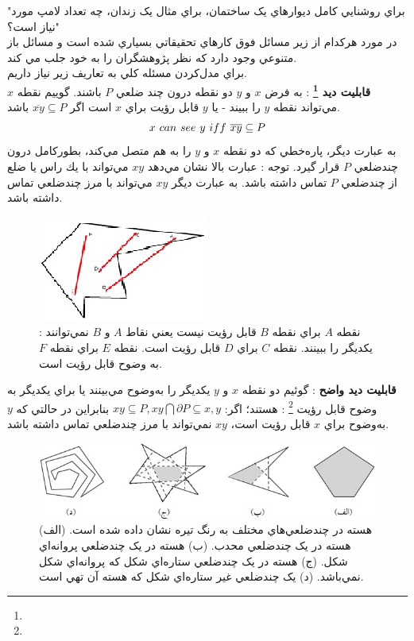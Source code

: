 \documentclass{book}
\begin{document}
    "براي روشنايي کامل ديوارهاي يک ساختمان، براي مثال يک زندان، چه تعداد لامپ مورد نياز است؟"\\
     در مورد هرکدام از زير مسائل فوق کارهاي تحقيقاتي بسياري شده است و مسائل باز متنوعي وجود دارد که نظر پژوهشگران را به خود جلب مي کند.\\
     براي مدل‌کردن مسئله کلي به تعاريف زير نياز داريم.\\
     \textbf{قابلیت دید
     \footnote{}}
 :
به فرض  $x$ و $y$ دو نقطه درون چند ضلعي $P$ باشند. گوييم نقطه $x$ مي‌تواند نقطه $y$ را ببيند - يا $y$ قابل رؤيت براي $x$ است اگر 
$\overline{xy} \subseteq P$
باشد.
$$x \hspace{0.125cm} can \hspace{0.125cm} see \hspace{0.125cm} y \hspace{0.125cm} iff  \hspace{0.125cm} \overline{xy} \subseteq P$$
به عبارت ديگر، پاره‌خطي که دو نقطه $x$ و $y$ را به هم متصل مي‌کند، بطورکامل درون چندضلعي $P$ قرار گيرد. 
توجه : عبارت بالا نشان مي‌دهد $xy$ مي‌تواند با يك راس يا ضلع از چندضلعي $P$ تماس داشته باشد. به عبارت ديگر $xy$ مي‌تواند با مرز چندضلعي تماس داشته باشد.  \\
\begin{figure}[h!]
	\begin{center}
		\includegraphics{7.jpg}
		\caption{
			:  نقطه $A$ براي نقطه $B$ قابل رؤيت نيست يعني نقاط $A$ و $B$  نمي‌توانند يکديگر را  ببينند. نقطه $C$ براي $D$ قابل رؤيت است. نقطه $E$ براي نقطه $F$ به وضوح قابل رؤيت است.}
	\end{center}
   	\label{شکل 7}
 	      \end{figure}
            \textbf{قابلیت دید واضح}
:  گوئيم دو نقطه $x$ و $y$ يکديگر را  به‌‌وضوح مي‌بينند يا براي يکديگر به وضوح قابل رؤيت
\footnote{}
 : هستند؛ اگر:
 $xy \subseteq P , xy \bigcap \partial P \subseteq {x,y}$
 بنابراين در حالتي که $y$ به‌‌وضوح براي  $x$ قابل رؤيت است، $xy$  نمي‌تواند با مرز چندضلعي تماس داشته باشد. 
 \begin{figure}[h!]
 	\begin{center}
 		\includegraphics{8.jpg}
 		\caption{
هسته در چندضلعي‌هاي مختلف به رنگ تيره نشان داده شده است. (الف) هسته در يک چندضلعي محدب. (ب) هسته در يک چندضلعي پروانه‌اي شکل. (ج) هسته در يک چندضلعي ستاره‌اي شکل که پروانه‌اي شکل نمي‌باشد. (د) يک چندضلعي غير ستاره‌اي شکل که هسته آن تهي است.}
 	\end{center}
    	\label{شکل 8}
 \end{figure}
\end{document}
